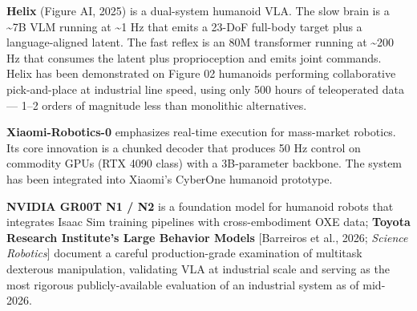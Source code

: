 \documentclass{article}
\begin{document}
\textbf{Helix} (Figure AI, 2025) is a dual-system humanoid VLA. The slow brain is a \textasciitilde7B VLM running at \textasciitilde1 Hz that emits a 23-DoF full-body target plus a language-aligned latent. The fast reflex is an 80M transformer running at \textasciitilde200 Hz that consumes the latent plus proprioception and emits joint commands. Helix has been demonstrated on Figure 02 humanoids performing collaborative pick-and-place at industrial line speed, using only 500 hours of teleoperated data --- 1--2 orders of magnitude less than monolithic alternatives.

\textbf{Xiaomi-Robotics-0} \cite{cai2026xiaomirobotics0ano} emphasizes real-time execution for mass-market robotics. Its core innovation is a chunked decoder that produces 50 Hz control on commodity GPUs (RTX 4090 class) with a 3B-parameter backbone. The system has been integrated into Xiaomi's CyberOne humanoid prototype.

\textbf{NVIDIA GR00T N1 / N2} is a foundation model for humanoid robots that integrates Isaac Sim training pipelines with cross-embodiment OXE data; \textbf{Toyota Research Institute's Large Behavior Models} {[}Barreiros et al., 2026; \emph{Science Robotics}{]} document a careful production-grade examination of multitask dexterous manipulation, validating VLA at industrial scale and serving as the most rigorous publicly-available evaluation of an industrial system as of mid-2026.
\end{document}
